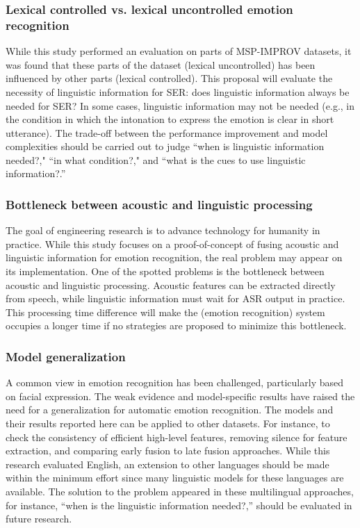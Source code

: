 \subsubsection{Lexical controlled vs. lexical uncontrolled emotion recognition}
While this study performed an evaluation on parts of MSP-IMPROV datasets, it
was found that these parts of the dataset (lexical uncontrolled) has been
influenced by other parts (lexical controlled). This proposal will evaluate the
necessity of linguistic information for SER: does linguistic information always
be needed for SER? In some cases, linguistic information may not be needed
(e.g., in the condition in which the intonation to express the emotion is clear
in short utterance). The trade-off between the performance improvement and
model complexities should be carried out to judge ``when is linguistic
information needed?," ``in what condition?," and ``what is the cues to use
linguistic information?.''

\subsubsection{Bottleneck between acoustic and linguistic processing}
The goal of engineering research is to advance technology for humanity in
practice. While this study focuses on a proof-of-concept of fusing acoustic
and linguistic information for emotion recognition, the real problem may appear
on its implementation. One of the spotted problems is the bottleneck between
acoustic and linguistic processing.  Acoustic features can be extracted
directly from speech, while linguistic information must wait for ASR output in
practice. This processing  time difference will make the (emotion recognition)
system occupies a longer time if no strategies are proposed to minimize this
bottleneck.

\subsubsection{Model generalization}
A common view in emotion recognition has been challenged, particularly based on
facial expression. The weak evidence and model-specific results have raised the
need for a generalization for automatic emotion recognition. The models and
their results reported here can be applied to other datasets. For instance, to
check the consistency of efficient high-level features, removing silence for
feature extraction, and comparing early fusion to late fusion approaches. While
this research evaluated English, an extension to other languages should be made
within the minimum effort since many linguistic models for these languages are
available. The solution to the problem appeared in these multilingual
approaches, for instance, ``when is the linguistic information needed?,''
should be evaluated in future research.

